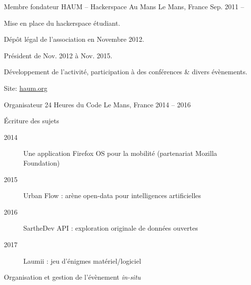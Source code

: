 

\begin{cventries}

  \cventry
    {Membre fondateur} %
    {HAUM -- Hackerspace Au Mans} %
    {Le Mans, France} %
    {Sep. 2011 --} %
    {
      \begin{cvitems} %
        \item {Mise en place du hackerspace étudiant.}
				\item {Dépôt légal de l'association en Novembre 2012.}
        \item {Président de Nov. 2012 à Nov. 2015.}
				\item {Développement de l'activité, participation à des conférences \& divers évènements.}
				\item {Site: \href{https://haum.org}{haum.org}}
      \end{cvitems}
    }

  \cventry
    {Organisateur} %
    {24 Heures du Code} %
    {Le Mans, France} %
    {2014 -- 2016} %
    {
      \begin{cvitems} %
        \item {Écriture des sujets
					\begin{description}
						\item[2014] Une application Firefox OS pour la mobilité (partenariat Mozilla Foundation)
						\item[2015] Urban Flow : arène open-data pour intelligences artificielles
						\item[2016] SartheDev API : exploration originale de données ouvertes
						\item[2017] Laumii : jeu d'énigmes matériel/logiciel
					\end{description}
				}
				\item {Organisation et gestion de l'évènement \textit{in-situ}}
      \end{cvitems}
    }


\end{cventries}
